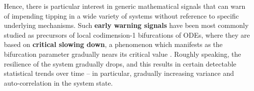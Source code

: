 Hence, there is particular interest in generic mathematical signals that can warn of impending tipping in a wide variety of systems without reference to specific underlying mechanisms. 
%
Such \textbf{early warning signals} have been most commonly studied as precursors of local codimension-1 bifurcations of ODEs, where they are based on \textbf{critical slowing down}, a phenomenon which manifests as the bifurcation parameter gradually nears its critical value \cite{schefferEarlywarningSignalsCritical2009a}.
% 
Roughly speaking, the resilience of the system gradually drops, and this results in certain detectable statistical trends over time -- in particular, gradually increasing variance and auto-correlation in the system state. 
%












